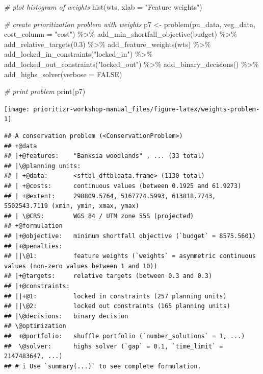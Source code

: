 \documentclass[
  12pt,
]{book}
\newenvironment{Shaded}{\begin{snugshade}}{\end{snugshade}}
\newcommand{\AttributeTok}[1]{\textcolor[rgb]{0.77,0.63,0.00}{#1}}
\newcommand{\CommentTok}[1]{\textcolor[rgb]{0.56,0.35,0.01}{\textit{#1}}}
\newcommand{\ConstantTok}[1]{\textcolor[rgb]{0.00,0.00,0.00}{#1}}
\newcommand{\FloatTok}[1]{\textcolor[rgb]{0.00,0.00,0.81}{#1}}
\newcommand{\FunctionTok}[1]{\textcolor[rgb]{0.00,0.00,0.00}{#1}}
\newcommand{\NormalTok}[1]{#1}
\newcommand{\OtherTok}[1]{\textcolor[rgb]{0.56,0.35,0.01}{#1}}
\newcommand{\SpecialCharTok}[1]{\textcolor[rgb]{0.00,0.00,0.00}{#1}}
\newcommand{\StringTok}[1]{\textcolor[rgb]{0.31,0.60,0.02}{#1}}
\begin{document}
\begin{Shaded}
\begin{Highlighting}[]
\CommentTok{\# plot histogram of weights}
\FunctionTok{hist}\NormalTok{(wts, }\AttributeTok{xlab =} \StringTok{"Feature weights"}\NormalTok{)}

\CommentTok{\# create prioritization problem with weights}
\NormalTok{p7 }\OtherTok{\textless{}{-}}
  \FunctionTok{problem}\NormalTok{(pu\_data, veg\_data, }\AttributeTok{cost\_column =} \StringTok{"cost"}\NormalTok{) }\SpecialCharTok{\%\textgreater{}\%}
  \FunctionTok{add\_min\_shortfall\_objective}\NormalTok{(budget) }\SpecialCharTok{\%\textgreater{}\%}
  \FunctionTok{add\_relative\_targets}\NormalTok{(}\FloatTok{0.3}\NormalTok{) }\SpecialCharTok{\%\textgreater{}\%}
  \FunctionTok{add\_feature\_weights}\NormalTok{(wts) }\SpecialCharTok{\%\textgreater{}\%}
  \FunctionTok{add\_locked\_in\_constraints}\NormalTok{(}\StringTok{"locked\_in"}\NormalTok{) }\SpecialCharTok{\%\textgreater{}\%}
  \FunctionTok{add\_locked\_out\_constraints}\NormalTok{(}\StringTok{"locked\_out"}\NormalTok{) }\SpecialCharTok{\%\textgreater{}\%}
  \FunctionTok{add\_binary\_decisions}\NormalTok{() }\SpecialCharTok{\%\textgreater{}\%}
  \FunctionTok{add\_highs\_solver}\NormalTok{(}\AttributeTok{verbose =} \ConstantTok{FALSE}\NormalTok{)}

\CommentTok{\# print problem}
\FunctionTok{print}\NormalTok{(p7)}
\end{Highlighting}
\end{Shaded}

\begin{center}\texttt{[image: prioritizr-workshop-manual\_files/figure-latex/weights-problem-1]} \end{center}

\begin{verbatim}
## A conservation problem (<ConservationProblem>)
## +@data
## |+@features:    "Banksia woodlands" , ... (33 total)
## |\@planning units:
## | +@data:       <sftbl_dftbldata.frame> (1130 total)
## | +@costs:      continuous values (between 0.1925 and 61.9273)
## | +@extent:     298809.5764, 5167774.5993, 613818.7743, 5502543.7119 (xmin, ymin, xmax, ymax)
## | \@CRS:        WGS 84 / UTM zone 55S (projected)
## +@formulation
## |+@objective:   minimum shortfall objective (`budget` = 8575.5601)
## |+@penalties:
## ||\@1:          feature weights (`weights` = asymmetric continuous values (non-zero values between 1 and 10))
## |+@targets:     relative targets (between 0.3 and 0.3)
## |+@constraints:
## ||+@1:          locked in constraints (257 planning units)
## ||\@2:          locked out constraints (165 planning units)
## |\@decisions:   binary decision
## \@optimization
##  +@portfolio:   shuffle portfolio (`number_solutions` = 1, ...)
##  \@solver:      highs solver (`gap` = 0.1, `time_limit` = 2147483647, ...)
## # i Use `summary(...)` to see complete formulation.
\end{verbatim}
\end{document}
